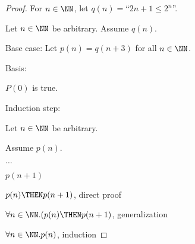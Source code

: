 \documentclass[11pt]{scrartcl}
\begin{document}
\begin{proof}
  For $n \in \NN$, let $q(n)=$``$2n+1 \leq 2^{n}$''.

  Let $n\in \NN$ be arbitrary. Assume $q(n)$.
  
  Base case: Let $p(n) = q(n+3)$ for all $n\in \NN$.

  Basis:

  $P(0)$ is true.

  Induction step:

  Let $n\in \NN$ be arbitrary.

  Assume $p(n)$.

  $\dots$

  $p(n+1)$

  $p(n)\THEN p(n+1)$, direct proof

  $\forall n\in \NN.(p(n)\THEN p(n+1)$, generalization
  
  $\forall n\in \NN. p(n)$, induction

\end{proof}
\end{document}

